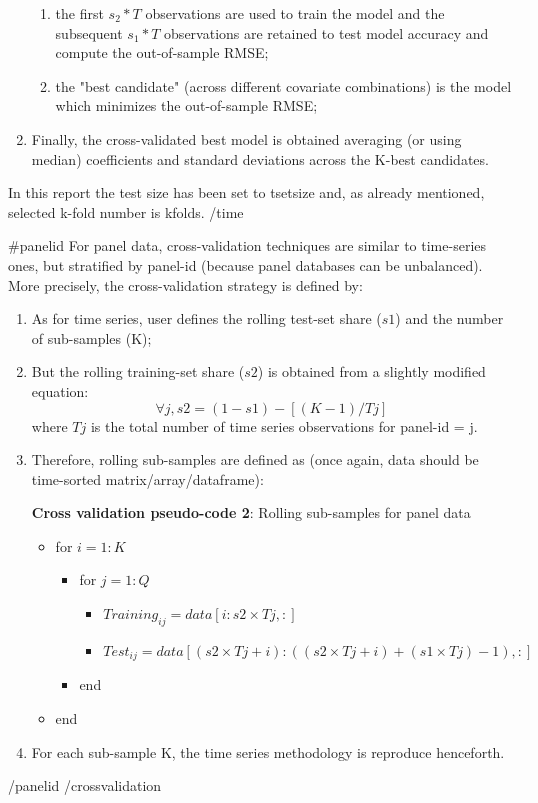 \documentclass{article}
\begin{document}
\begin{enumerate}
\begin{enumerate}
\item the first $s_{2}*T$ observations are used to train the model and the subsequent $s_{1}*T$ observations are retained to test model accuracy and compute the out-of-sample RMSE;
\item the "best candidate" (across different covariate combinations) is the model which minimizes the out-of-sample RMSE;
\end{enumerate}
\item Finally, the cross-validated best model is obtained averaging (or using median) coefficients and standard deviations across the K-best candidates.
\end{enumerate}

In this report the test size has been set to {{tsetsize}} and, as already mentioned,
selected k-fold number is {{kfolds}}.
{{/time}}

{{#panelid}}
For panel data, cross-validation techniques are similar to time-series ones, but stratified by panel-id (because panel databases can be unbalanced). More precisely, the cross-validation strategy is defined by:

\begin{enumerate}
\item As for time series, user defines the rolling test-set share ($s1$) and the number of sub-samples (K);
\item But the rolling training-set share ($s2$) is obtained from a slightly modified equation:
\begin{equation}
  \forall j, s2=(1-s1)-[(K-1)/T{j}] 
\end{equation}
where $T{j}$ is the total number of time series observations for panel-id = j.
\item Therefore, rolling sub-samples are defined as (once again, data should be time-sorted matrix/array/dataframe):

\begin{algorithm}
\caption*{\textbf{Cross validation pseudo-code 2}: Rolling sub-samples for panel data}
\begin{itemize}
    \item[] for $i=1:K$
    \begin{itemize}
        \item[]  for $j=1:Q$
        \begin{itemize}
            \item[] $Training_{ij}=data[i:s2 \times T{j},:]$
            \item[] $Test_{ij}=data[(s2 \times T{j}+i):((s2 \times T{j}+i)+(s1 \times T{j})-1),:]$
        \end{itemize}
        \item[] end
    \end{itemize}
    \item[] end
\end{itemize}     
\end{algorithm}

\item For each sub-sample K, the time series methodology is reproduce henceforth.
\end{enumerate}
{{/panelid}}
{{/crossvalidation}}
\end{document}
